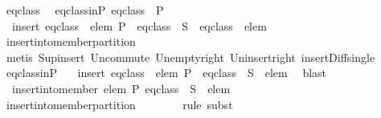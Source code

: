 \begin{isabellebody}
\ eq{\isacharunderscore}class\ \isamarkupfalse%
\ eq{\isacharunderscore}class{\isacharunderscore}in{\isacharunderscore}P{\isacharcolon}\ {\isachardoublequoteopen}eq{\isacharunderscore}class\ {\isasymin}\ P{\isachardoublequoteclose}\isanewline
\ \ \ \ \isamarkupfalse%
\ {\isachardoublequoteopen}{\isasymUnion}\ insert\ {\isacharparenleft}eq{\isacharunderscore}class\ {\isasymunion}\ {\isacharbraceleft}elem{\isacharbraceright}{\isacharparenright}\ {\isacharparenleft}P\ {\isacharminus}\ {\isacharbraceleft}eq{\isacharunderscore}class{\isacharbraceright}{\isacharparenright}\ {\isacharequal}\ {\isacharquery}S\ {\isasymunion}\ {\isacharparenleft}eq{\isacharunderscore}class\ {\isasymunion}\ {\isacharbraceleft}elem{\isacharbraceright}{\isacharparenright}{\isachardoublequoteclose}\isanewline
\ \ \ \ \ \ \isamarkupfalse%
\ insert{\isacharunderscore}into{\isacharunderscore}member{\isacharunderscore}partition{}\isanewline
\ \ \ \ \ \ \isamarkupfalse%
\ {\isacharparenleft}metis\ Sup{\isacharunderscore}insert\ Un{\isacharunderscore}commute\ Un{\isacharunderscore}empty{\isacharunderscore}right\ Un{\isacharunderscore}insert{\isacharunderscore}right\ insert{\isacharunderscore}Diff{\isacharunderscore}single{\isacharparenright}\isanewline
\ \ \ \ \isamarkupfalse%
\ eq{\isacharunderscore}class{\isacharunderscore}in{\isacharunderscore}P\ \isamarkupfalse%
\ {\isachardoublequoteopen}{\isasymUnion}\ insert\ {\isacharparenleft}eq{\isacharunderscore}class\ {\isasymunion}\ {\isacharbraceleft}elem{\isacharbraceright}{\isacharparenright}\ {\isacharparenleft}P\ {\isacharminus}\ {\isacharbraceleft}eq{\isacharunderscore}class{\isacharbraceright}{\isacharparenright}\ {\isacharequal}\ {\isacharquery}S\ {\isasymunion}\ {\isacharbraceleft}elem{\isacharbraceright}{\isachardoublequoteclose}\ \isamarkupfalse%
\ blast\isanewline
\ \ \ \ \isamarkupfalse%
\ \isamarkupfalse%
\ {\isachardoublequoteopen}{\isasymUnion}\ insert{\isacharunderscore}into{\isacharunderscore}member\ elem\ P\ eq{\isacharunderscore}class\ {\isacharequal}\ {\isacharquery}S\ {\isasymunion}\ {\isacharbraceleft}elem{\isacharbraceright}{\isachardoublequoteclose}\isanewline
\ \ \ \ \ \ \isamarkupfalse%
\ insert{\isacharunderscore}into{\isacharunderscore}member{\isacharunderscore}partition{}\isanewline
\ \ \ \ \ \ \isamarkupfalse%
\ {\isacharparenleft}rule\ subst{\isacharparenright}\isanewline
\ \ \isacommand{{\isacharbraceright}}\isamarkupfalse%

\end{isabellebody}
